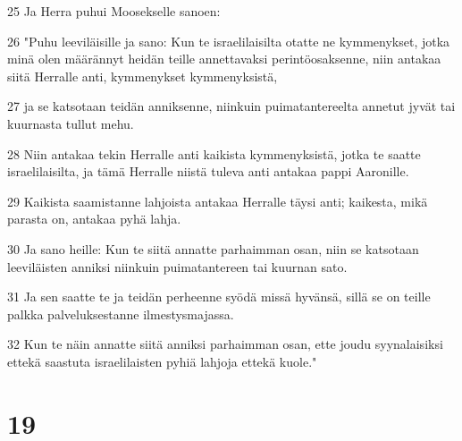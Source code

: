 \par 25 Ja Herra puhui Moosekselle sanoen:
\par 26 "Puhu leeviläisille ja sano: Kun te israelilaisilta otatte ne kymmenykset, jotka minä olen määrännyt heidän teille annettavaksi perintöosaksenne, niin antakaa siitä Herralle anti, kymmenykset kymmenyksistä,
\par 27 ja se katsotaan teidän anniksenne, niinkuin puimatantereelta annetut jyvät tai kuurnasta tullut mehu.
\par 28 Niin antakaa tekin Herralle anti kaikista kymmenyksistä, jotka te saatte israelilaisilta, ja tämä Herralle niistä tuleva anti antakaa pappi Aaronille.
\par 29 Kaikista saamistanne lahjoista antakaa Herralle täysi anti; kaikesta, mikä parasta on, antakaa pyhä lahja.
\par 30 Ja sano heille: Kun te siitä annatte parhaimman osan, niin se katsotaan leeviläisten anniksi niinkuin puimatantereen tai kuurnan sato.
\par 31 Ja sen saatte te ja teidän perheenne syödä missä hyvänsä, sillä se on teille palkka palveluksestanne ilmestysmajassa.
\par 32 Kun te näin annatte siitä anniksi parhaimman osan, ette joudu syynalaisiksi ettekä saastuta israelilaisten pyhiä lahjoja ettekä kuole."

\chapter{19}

